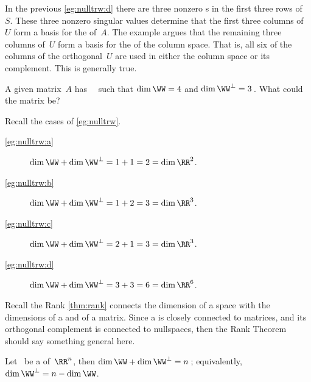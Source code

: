 \begin{reduce}
\begin{example}
\begin{enumerate}[ref=\ref{eg:nulltrw}(\alph*)]
\end{enumerate}
\end{example}


In the previous \autoref{eg:nulltrw:d} there are three nonzero s in the first three rows of~\(S\).
These three nonzero singular values determine that the first three columns of~\(U\) form a basis for the  of~\(A\).
The example argues that the remaining three columns of~\(U\) form a basis for the  of the column space.
That is, all six of the columns of the orthogonal~\(U\) are used in either the column space or its complement.
This is generally true.

\begin{activity}
A given matrix~\(A\) has ~\WW\ such that \(\dim\WW=4\) and \(\dim\WW^\perp=3\)\,.  
What  could the matrix be?
\end{activity}



\begin{example} \label{eg:orthrank}
Recall the cases of \autoref{eg:nulltrw}.
\begin{description}
\item[\ref{eg:nulltrw:a}] \(\dim\WW+\dim\WW^\perp=1+1=2=\dim\RR^2\).
\item[\ref{eg:nulltrw:b}] \(\dim\WW+\dim\WW^\perp=1+2=3=\dim\RR^3\).
\item[\ref{eg:nulltrw:c}] \(\dim\WW+\dim\WW^\perp=2+1=3=\dim\RR^3\).
\item[\ref{eg:nulltrw:d}] \(\dim\WW+\dim\WW^\perp=3+3=6=\dim\RR^6\).
\end{description}
\end{example}

Recall the Rank \autoref{thm:rank} connects the  dimension of a space with the dimensions of a  and  of a matrix.
Since a  is closely connected to matrices, and its orthogonal complement is connected to nullspaces, then the Rank Theorem should say something general here.



\begin{theorem} \label{thm:orthrank}
Let \WW\ be a  of~\(\RR^n\), then \(\dim\WW+\dim\WW^\perp=n\)\,; equivalently, \(\dim\WW^\perp=n-\dim\WW\).
\end{theorem}


\end{reduce}
